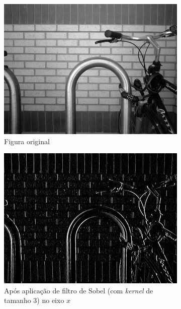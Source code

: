 \documentclass[10pt,a4paper]{article}
\newcommand{\kernel}{\textit{kernel} }
\begin{document}
\begin{figure}[!ht]
    \centering
    \begin{subfigure}[ht]{0.45\textwidth}
        \includegraphics[width=\textwidth]{src.jpg}
        \caption{Figura original\cite{bike}}
        \label{fig:src}
    \end{subfigure}
    \qquad
    \begin{subfigure}[ht]{0.45\textwidth}
        \includegraphics[width=\textwidth]{sobel_x.jpg}
        \caption{\centering Após aplicação de filtro de Sobel (com \kernel de tamanho 3) no eixo $x$}
        \label{fig:sobel_x}
    \end{subfigure}
    \\
    \begin{subfigure}[ht]{0.45\textwidth}

\end{subfigure}
\end{figure}
\end{document}
